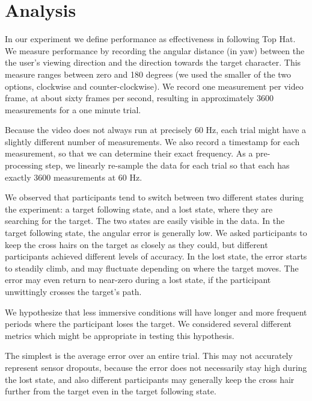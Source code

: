 \documentclass{acmsiggraph}                     %
\begin{document}
\section{Analysis}

In our experiment we define performance as effectiveness in following Top Hat.  We measure performance by recording the angular distance (in yaw) between the the user's viewing direction and the direction towards the target character.  This measure ranges between zero and 180 degrees (we used the smaller of the two options, clockwise and counter-clockwise).  We record one measurement per video frame, at about sixty frames per second, resulting in approximately 3600 measurements for a one minute trial.

Because the video does not always run at precisely 60 Hz, each trial might have a slightly different number of measurements.  We also record a timestamp for each measurement, so that we can determine their exact frequency.  As a pre-processing step, we linearly re-sample the data for each trial so that each has exactly 3600 measurements at 60 Hz.

We observed that participants tend to switch between two different states during the experiment: a target following state, and a lost state, where they are searching for the target.  The two states are easily visible in the data.  In the target following state, the angular error is generally low.  We asked participants to keep the cross hairs on the target as closely as they could, but different participants achieved different levels of accuracy.  In the lost state, the error starts to steadily climb, and may fluctuate depending on where the target moves.  The error may even return to near-zero during a lost state, if the participant unwittingly crosses the target's path.


We hypothesize that less immersive conditions will have longer and more frequent periods where the participant loses the target.  We considered several different metrics which might be appropriate in testing this hypothesis.

The simplest is the average error over an entire trial.  This may not accurately represent sensor dropouts, because the error does not necessarily stay high during the lost state, and also different participants may generally keep the cross hair further from the target even in the target following state.
\end{document}
